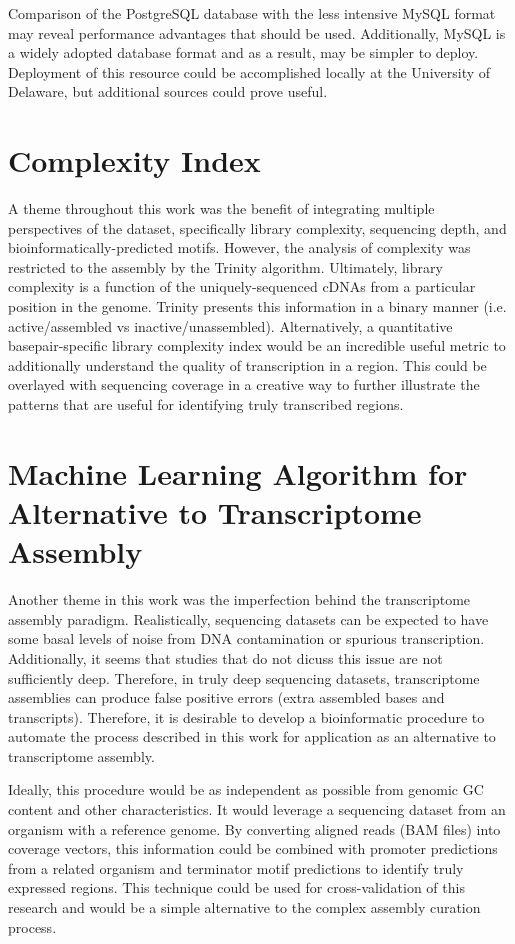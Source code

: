 Comparison of the PostgreSQL database with the less intensive MySQL format may reveal performance advantages that should be used. Additionally, MySQL is a widely adopted database format and as a result, may be simpler to deploy. Deployment of this resource could be accomplished locally at the University of Delaware, but additional sources could prove useful.

\section{Complexity Index}
A theme throughout this work was the benefit of integrating multiple perspectives of the dataset, specifically library complexity, sequencing depth, and bioinformatically-predicted motifs. However, the analysis of complexity was restricted to the assembly by the Trinity algorithm. Ultimately, library complexity is a function of the uniquely-sequenced cDNAs from a particular position in the genome. Trinity presents this information in a binary manner (i.e. active/assembled vs inactive/unassembled). Alternatively, a quantitative basepair-specific library complexity index would be an incredible useful metric to additionally understand the quality of transcription in a region. This could be overlayed with sequencing coverage in a creative way to further illustrate the patterns that are useful for identifying truly transcribed regions.

\section{Machine Learning Algorithm for Alternative to Transcriptome Assembly}
Another theme in this work was the imperfection behind the transcriptome assembly paradigm. Realistically, sequencing datasets can be expected to have some basal levels of noise from DNA contamination or spurious transcription. Additionally, it seems that studies that do not dicuss this issue are not sufficiently deep. Therefore, in truly deep sequencing datasets, transcriptome assemblies can produce false positive errors (extra assembled bases and transcripts). Therefore, it is desirable to develop a bioinformatic procedure to automate the process described in this work for application as an alternative to transcriptome assembly. 

Ideally, this procedure would be as independent as possible from genomic GC content and other characteristics. It would leverage a sequencing dataset from an organism with a reference genome. By converting aligned reads (BAM files) into coverage vectors, this information could be combined with promoter predictions from a related organism and terminator motif predictions to identify truly expressed regions. This technique could be used for cross-validation of this research and would be a simple alternative to the complex assembly curation process. 


